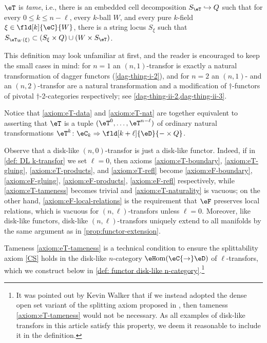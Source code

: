 \documentclass[12pt,reqno]{amsart}
\newcommand{\eFun}{{\eH}\mathrm{om}}
\newcommand{\C}{\eC}
\newcommand{\D}{\eD}
\newcommand{\defn}[1]{\emph{#1}}
\begin{document}
\begin{definition}
\begin{lst}
    \item[($\eT$S)]\label{axiom:eT-tameness}
    $\eT$ is \defn{tame}, i.e., there is an embedded cell decomposition $S_\eT \hookrightarrow Q$ such that for every $0\leq k \leq n-\ell$, every $k$-ball $W$, and every pure $k$-field $\xi\in\fld[k]{\C}{W}$, there is a string locus $S_\xi$ such that $S_{\eT_W(\xi)} \subset (S_\xi \times Q) \cup (W \times S_\eT)$.
\end{lst}
\end{definition}

This definition may look unfamiliar at first, and the reader is encouraged to keep the small cases in mind: for $n=1$ an $(n,1)$-transfor is exactly a natural transformation of dagger functors (\cref{dag-thing-i-2}), and for $n=2$ an $(n,1)$- and an $(n,2)$-transfor are a natural transformation and a modification of $\dag$-functors of pivotal $\dag$-2-categories respectively; see \cref{dag-thing-ii-2,dag-thing-ii-3}. 

Notice that \ref{axiom:eT-data} and \ref{axiom:eT-nat} are together equivalent to asserting that $\eT$ is a tuple $(\eT^0,\dots, \eT^{n-\ell})$ of ordinary natural transformations $\eT^k\colon\C_k\Rightarrow\fld[k+\ell]{\D}{-\times Q}$. 

Observe that a disk-like $(n,0)$-transfor is just a disk-like functor. Indeed, if in \cref{def: DL k-transfor} we set $\ell=0$, then axioms \ref{axiom:eT-boundary}, \ref{axiom:eT-gluing}, \ref{axiom:eT-products}, and \ref{axiom:eT-refl} become \ref{axiom:eF-boundary}, \ref{axiom:eF-gluing}, \ref{axiom:eF-products}, \ref{axiom:eF-refl} respectively, while \ref{axiom:eT-tameness} becomes trivial and \ref{axiom:eT-naturality} is vacuous; on the other hand, \ref{axiom:eF-local-relations} is the requirement that $\eF$ preserves local relations, which is vacuous for $(n,\ell)$-transfors unless $\ell=0$. Moreover, like disk-like functors, disk-like $(n,\ell)$-transfors uniquely extend to all manifolds by the same argument as in \cref{prop:functor-extension}.

Tameness \ref{axiom:eT-tameness} is a technical condition to ensure the splittability axiom \ref{CS} holds in the disk-like $n$-category $\eFun(\C{\to}\D)$ of $\ell$-transfors, which we construct below in \cref{def: functor disk-like n-category}.\footnote{It was pointed out by Kevin Walker that if we instead adopted the dense open set variant of the splitting axiom proposed in \cite{MW12}, then tameness \ref{axiom:eT-tameness} would not be necessary. As all examples of disk-like transfors in this article satisfy this property, we deem it reasonable to include it in the definition.}
\end{document}
